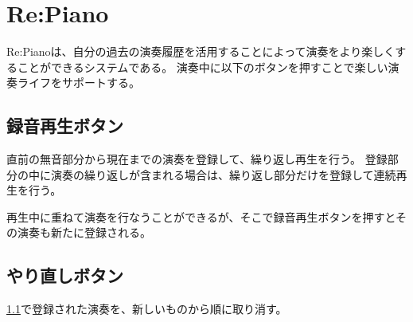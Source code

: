 \section{Re:Piano}
\label{repiano}

Re:Pianoは、自分の過去の演奏履歴を活用することによって演奏をより楽しくすることができるシステムである。
演奏中に以下のボタンを押すことで楽しい演奏ライフをサポートする。

\subsection{録音再生ボタン}
\label{recplaybutton}
直前の無音部分から現在までの演奏を登録して、繰り返し再生を行う。
登録部分の中に演奏の繰り返しが含まれる場合は、繰り返し部分だけを登録して連続再生を行う。

再生中に重ねて演奏を行なうことができるが、そこで録音再生ボタンを押すとその演奏も新たに登録される。

\subsection{やり直しボタン}
\ref{recplaybutton}で登録された演奏を、新しいものから順に取り消す。
